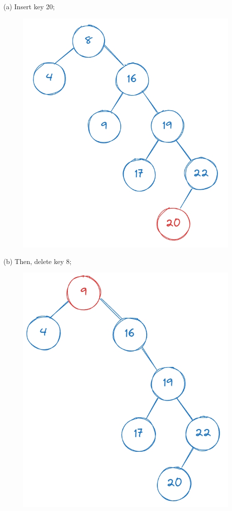 \noindent \begin{minipage}{0.5\textwidth}
(a) Insert key 20;
\begin{figure}[H]
    \centering
    \includegraphics[width=0.8\linewidth]{HWs/HW6/figures/4-2.png}
\end{figure}
\end{minipage}
\begin{minipage}{0.5\textwidth}
(b) Then, delete key 8;
\begin{figure}[H]
    \centering
    \includegraphics[width=0.8\linewidth]{HWs/HW6/figures/4-3.png}
\end{figure}
\end{minipage}

